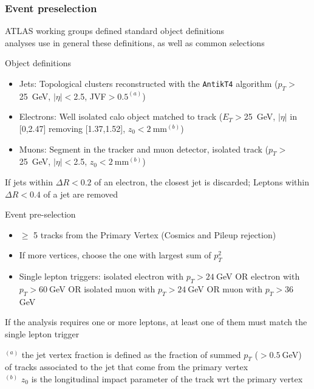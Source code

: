 \documentclass[xcolor=dvipsnames,10pt]{beamer}
\begin{document}
\begin{frame}\frametitle{Event preselection}
\footnotesize\centering

ATLAS working groups defined standard object definitions\\
analyses use in general these definitions, as well as common selections\\

\myskip

\begin{minipage}{.5\textwidth}
\centering
\alert{Object definitions}

\begin{itemize}\scriptsize
\item \alert{Jets}: Topological clusters reconstructed with the \texttt{AntikT4} algorithm ($p_T > $25~GeV, $|\eta|<$2.5, JVF$>0.5^{(a)}$) 
\item \alert{Electrons}: Well isolated calo object matched to track ($E_T>$25~GeV, $|\eta|$ in [0,2.47] removing [1.37,1.52], $z_0<2~$mm$^{(b)}$)
\item \alert{Muons}: Segment in the tracker and muon detector, isolated track ($p_T>$ 25~GeV, $|\eta|<$2.5, $z_0<2~$mm$^{(b)}$)
\end{itemize}
\scriptsize
If jets within $\Delta R < 0.2$ of an electron, the closest jet is discarded; Leptons within $\Delta R < 0.4$ of a jet are removed

\end{minipage}\begin{minipage}{.5\textwidth}
\centering


\alert{Event pre-selection}
\begin{itemize}\scriptsize
\item $\geq$ 5 tracks from the Primary Vertex (Cosmics and Pileup rejection)
\item If more vertices, choose the one with largest sum of $p_T^2$
\item Single lepton triggers: isolated electron with $p_T>24~$GeV OR electron with $p_T>60~$GeV OR isolated muon with $p_T>24~$GeV OR muon with $p_T>36~$GeV
\end{itemize}
\scriptsize
\myskip
If the analysis requires one or more leptons, at least one of them must match the single lepton trigger


\end{minipage}

\myskip

\tiny
$^{(a)}$ the jet vertex fraction is defined as the fraction of summed $p_T$ ($>0.5~$GeV) of tracks associated to the jet that come from the primary vertex\\
$^{(b)}$ $z_0$ is the longitudinal impact parameter of the track wrt the primary vertex


\end{frame}
\end{document}
